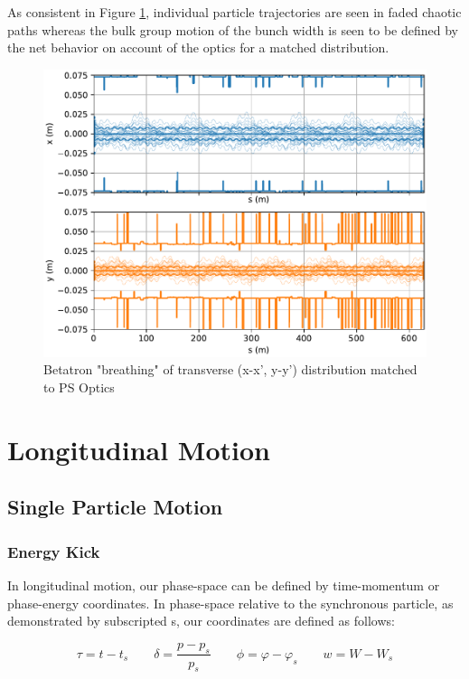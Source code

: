As consistent in Figure \ref{fig:ps_transverse_tracking}, individual particle trajectories are seen in faded chaotic paths whereas the bulk group motion of the bunch width is seen to be defined by the net behavior on account of the optics for a matched distribution.

\begin{figure}
    \centering
    \includegraphics{figs/ps_aperture.multivariate.pdf}
    \caption{Betatron "breathing" of transverse (x-x', y-y') distribution matched to PS Optics}
    \label{fig:ps_transverse_tracking}
\end{figure}

\section{Longitudinal Motion}

\subsection{Single Particle Motion}

\subsubsection{Energy Kick}

In longitudinal motion, our phase-space can be defined by time-momentum or phase-energy coordinates. In phase-space relative to the synchronous particle, as demonstrated by subscripted s, our coordinates are defined as follows:

$$\tau = t - t_s \qquad \delta = \frac{p-p_s}{p_s} \qquad \phi = \varphi - \varphi_s \qquad w = W-W_s$$

